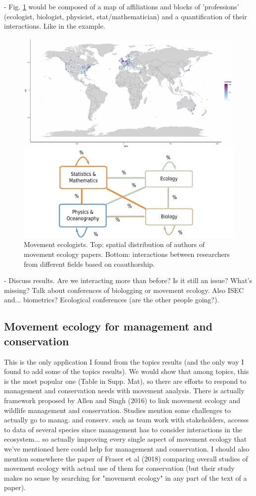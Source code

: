 \documentclass[9pt,twocolumn,twoside,lineno]{pnas-new}
\begin{document}
- Fig. \ref{fig:discip} would be composed of a map of affiliations and blocks of 'professions' (ecologist, biologist, physicist, stat/mathematician) and a quantification of their interactions. Like in the example.
\begin{figure}%
\centering
\includegraphics[width=.9\linewidth]{./img/interdiscip.pdf}
\caption{Movement ecologists. Top: spatial distribution of authors of movement ecology papers. Bottom: interactions between researchers from different fields based on coauthorship.}
\label{fig:discip}
\end{figure}

- Discuss results. Are we interacting more than before? Is it still an issue? What's missing? Talk about conferences of biologging or movement ecology. Also ISEC and... biometrics? Ecological conferences (are the other people going?). 

\subsection*{Movement ecology for management and conservation}

This is the only application I found from the topics results (and the only way I found to add some of the topics results). We would show that among topics, this is the most popular one (Table in Supp. Mat), so there are efforts to respond to management and conservation needs with movement analysis. There is actually framework proposed by Allen and Singh (2016) to link movement ecology and wildlife management and conservation. Studies mention some challenges to actually go to manag. and conserv. such as team work with stakeholders, accesss to data of several species since management has to consider interactions in the ecosystem... so actually improving every single aspect of movement ecology that we've mentioned here could help for management and conservation. I should also mention somewhere the paper of Fraser et al (2018) comparing overall studies of movement ecology with actual use of them for conservation (but their study makes no sense by searching for "movement ecology" in any part of the text of a paper).
\end{document}
